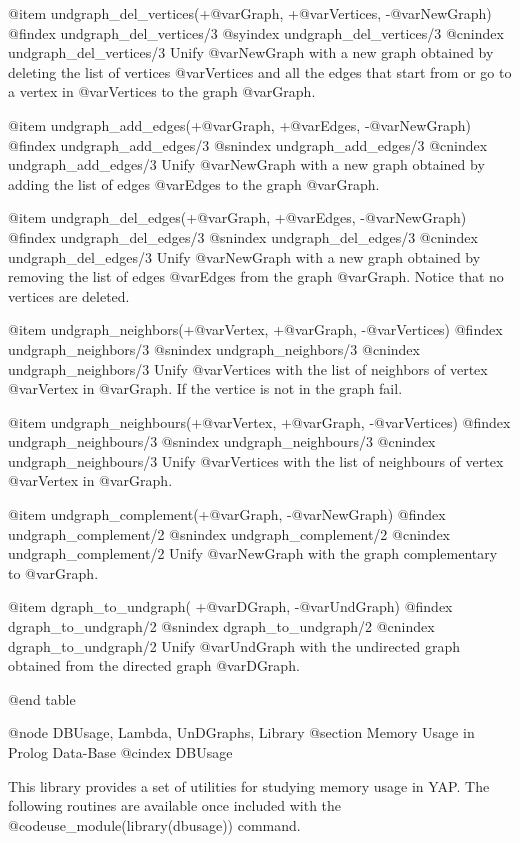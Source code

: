 {{{{{{{{@item undgraph_del_vertices(+@var{Graph}, +@var{Vertices}, -@var{NewGraph})
@findex  undgraph_del_vertices/3
@syindex undgraph_del_vertices/3
@cnindex undgraph_del_vertices/3
Unify @var{NewGraph} with a new graph obtained by deleting the list of
vertices @var{Vertices} and all the edges that start from or go to a
vertex in @var{Vertices} to the graph @var{Graph}.

@item undgraph_add_edges(+@var{Graph}, +@var{Edges}, -@var{NewGraph})
@findex  undgraph_add_edges/3
@snindex undgraph_add_edges/3
@cnindex undgraph_add_edges/3
Unify @var{NewGraph} with a new graph obtained by adding the list of
edges @var{Edges} to the graph @var{Graph}.

@item undgraph_del_edges(+@var{Graph}, +@var{Edges}, -@var{NewGraph})
@findex  undgraph_del_edges/3
@snindex undgraph_del_edges/3
@cnindex undgraph_del_edges/3
Unify @var{NewGraph} with a new graph obtained by removing the list of
edges @var{Edges} from the graph @var{Graph}. Notice that no vertices
are deleted.

@item undgraph_neighbors(+@var{Vertex}, +@var{Graph}, -@var{Vertices})
@findex  undgraph_neighbors/3
@snindex undgraph_neighbors/3
@cnindex undgraph_neighbors/3
Unify @var{Vertices} with the list of neighbors of vertex @var{Vertex}
in @var{Graph}. If the vertice is not in the graph fail.

@item undgraph_neighbours(+@var{Vertex}, +@var{Graph}, -@var{Vertices})
@findex  undgraph_neighbours/3
@snindex undgraph_neighbours/3
@cnindex undgraph_neighbours/3
Unify @var{Vertices} with the list of neighbours of vertex @var{Vertex}
in @var{Graph}.

@item undgraph_complement(+@var{Graph}, -@var{NewGraph})
@findex  undgraph_complement/2
@snindex undgraph_complement/2
@cnindex undgraph_complement/2
Unify @var{NewGraph} with the graph complementary to @var{Graph}.

@item dgraph_to_undgraph( +@var{DGraph}, -@var{UndGraph})
@findex  dgraph_to_undgraph/2
@snindex dgraph_to_undgraph/2
@cnindex dgraph_to_undgraph/2
Unify @var{UndGraph} with the undirected graph obtained from the
directed graph @var{DGraph}.

@end table

@node DBUsage, Lambda, UnDGraphs, Library
@section Memory Usage in Prolog Data-Base
@cindex DBUsage

This library provides a set of utilities for studying memory usage in YAP.
The following routines are available once included with the
@code{use_module(library(dbusage))} command.

}}}}}}}}
